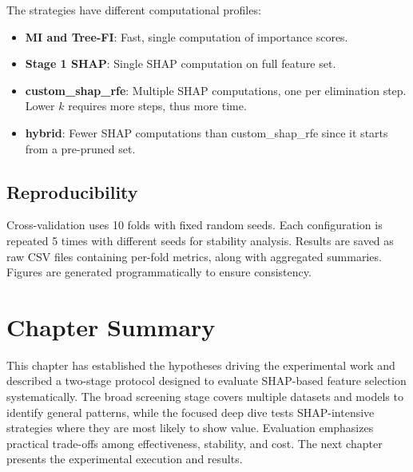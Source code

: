 The strategies have different computational profiles:
\begin{itemize}
    \item \textbf{MI and Tree-FI}: Fast, single computation of importance scores.
    \item \textbf{Stage 1 SHAP}: Single SHAP computation on full feature set.
    \item \textbf{custom\_shap\_rfe}: Multiple SHAP computations, one per elimination step. Lower $k$ requires more steps, thus more time.
    \item \textbf{hybrid}: Fewer SHAP computations than custom\_shap\_rfe since it starts from a pre-pruned set.
\end{itemize}

\subsection{Reproducibility}

Cross-validation uses 10 folds with fixed random seeds. Each configuration is repeated 5 times with different seeds for stability analysis. Results are saved as raw CSV files containing per-fold metrics, along with aggregated summaries. Figures are generated programmatically to ensure consistency.

\section{Chapter Summary}

This chapter has established the hypotheses driving the experimental work and described a two-stage protocol designed to evaluate SHAP-based feature selection systematically. The broad screening stage covers multiple datasets and models to identify general patterns, while the focused deep dive tests SHAP-intensive strategies where they are most likely to show value. Evaluation emphasizes practical trade-offs among effectiveness, stability, and cost. The next chapter presents the experimental execution and results.
